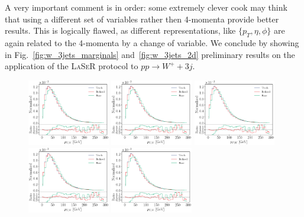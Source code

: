 %
A very important comment is in order:
some extremely clever cook may think that using a different set of variables rather then 4-momenta provide better results. This is logically flawed, as different representations, like $\{p_T, \eta, \phi\}$ are again related to the 4-momenta by a change of variable.
%
We conclude by showing in Fig.~\ref{fig:w_3jets_marginals} and~\ref{fig:w_3jets_2d} preliminary results on the application of the \textsc{LaSeR} protocol to $p p \to W^+ + 3j$.
\begin{figure}[H]
\centering
\includegraphics[width=0.32\textwidth, page=1]{./figures/wp_3j_HMC_ratio.pdf}
\includegraphics[width=0.32\textwidth, page=4]{./figures/wp_3j_HMC_ratio.pdf}
\includegraphics[width=0.32\textwidth, page=6]{./figures/wp_3j_HMC_ratio.pdf}\\
\includegraphics[width=0.32\textwidth, page=7]{./figures/wp_3j_HMC_ratio.pdf}
\includegraphics[width=0.32\textwidth, page=15]{./figures/wp_3j_HMC_ratio.pdf}

\end{figure}
